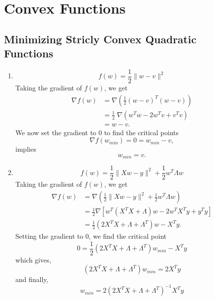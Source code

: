\section{Convex Functions}
\subsection{Minimizing Stricly Convex Quadratic Functions}
\begin{enumerate}
\item \begin{equation}
f(w) = \frac{1}{2}\| w - v\|^{2}
\end{equation}
Taking the gradient of $f(w)$, we get
\begin{align}
\nabla f(w) &= \nabla \left(\frac{1}{2}(w-v)^{T}(w-v)\right)\\
&=\frac{1}{2}\;\nabla\left(w^{T}w-2w^{T}v +v^{T}v\right)\nonumber\\
&=w-v.\nonumber
\end{align}
We now set the gradient to 0 to find the critical points
\begin{equation}
\nabla f(w_{min}) = 0 = w_{min} - v,
\end{equation}
implies 
\begin{equation}
w_{min} = v.
\end{equation}

\item \begin{equation}
f(w) = \frac{1}{2}\| Xw - y\|^{2}+\frac{1}{2}w^{T}\Lambda w
\end{equation}
Taking the gradient of $f(w)$, we get
\begin{align}
\nabla f(w) &= \nabla \left(\frac{1}{2}\| Xw - y\|^{2}+\frac{1}{2}w^{T}\Lambda w\right)\\
&=\frac{1}{2}\nabla \left[w^{T}\left(X^{T}X+\Lambda\right)w-2w^{T}X^{T}y+y^{T}y\right]\nonumber\\
&=\frac{1}{2}\left(2X^{T}X+\Lambda+\Lambda^{T}\right)w-X^{T}y\nonumber.
\end{align}
Setting the gradient to 0, we find the critical point
\begin{equation}
0 = \frac{1}{2}\left(2X^{T}X+\Lambda+\Lambda^{T}\right)w_{min}-X^{T}y
\end{equation}
which gives,
\begin{equation}
\left(2X^{T}X+\Lambda+\Lambda^{T}\right)w_{min} = 2X^{T}y 
\end{equation}
and finally, 
\begin{equation}
w_{min}=2\left(2X^{T}X+\Lambda+\Lambda^{T}\right)^{-1}X^{T}y
\end{equation}


\end{enumerate}
